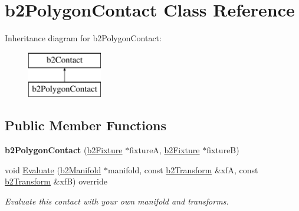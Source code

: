 \hypertarget{classb2_polygon_contact}{}\section{b2\+Polygon\+Contact Class Reference}
\label{classb2_polygon_contact}
Inheritance diagram for b2\+Polygon\+Contact\+:\begin{figure}[H]
\begin{center}
\leavevmode
\includegraphics[height=2.000000cm]{classb2_polygon_contact}
\end{center}
\end{figure}
\subsection*{Public Member Functions}
\begin{DoxyCompactItemize}
\item 
\mbox{\label{classb2_polygon_contact_a93cabf086e75ae40dcd1881760c71c63}} 
{\bfseries b2\+Polygon\+Contact} (\hyperlink{classb2_fixture}{b2\+Fixture} $\ast$fixtureA, \hyperlink{classb2_fixture}{b2\+Fixture} $\ast$fixtureB)
\item 
\mbox{\label{classb2_polygon_contact_aa9581ba4a2bc769b80e3f107801d0950}} 
void \hyperlink{classb2_polygon_contact_aa9581ba4a2bc769b80e3f107801d0950}{Evaluate} (\hyperlink{structb2_manifold}{b2\+Manifold} $\ast$manifold, const \hyperlink{structb2_transform}{b2\+Transform} \&xfA, const \hyperlink{structb2_transform}{b2\+Transform} \&xfB) override
\begin{DoxyCompactList}\small\item\em Evaluate this contact with your own manifold and transforms. \end{DoxyCompactList}\end{DoxyCompactItemize}
